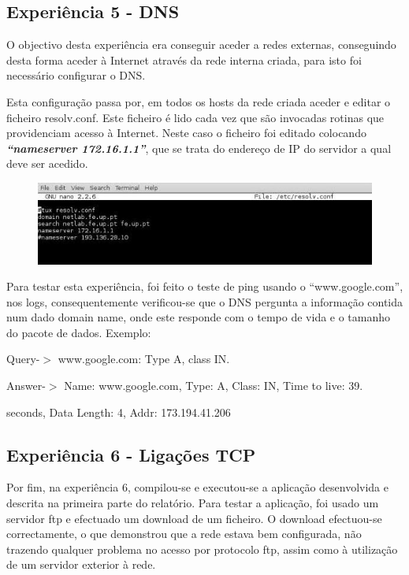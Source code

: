\documentclass[a4paper]{article}
\begin{document}
\subsection{Experiência 5 - DNS}
O objectivo desta experiência era conseguir aceder a redes externas, conseguindo desta forma aceder à Internet através da rede interna criada, para isto foi necessário configurar o DNS. 

Esta configuração passa por, em todos os hosts da rede criada aceder e editar o ficheiro resolv.conf. Este ficheiro é lido cada vez que são invocadas rotinas que providenciam acesso à Internet. Neste caso o ficheiro foi editado colocando \textbf{\textit{“nameserver 172.16.1.1”}}, que se trata do endereço de IP do servidor a qual deve ser acedido.	

\begin{figure}[h!]
\centering
\includegraphics[scale=0.5]{res/image4.jpg}
\end{figure}

Para testar esta experiência, foi feito o teste de ping usando o “www.google.com”, nos logs, consequentemente verificou-se que o DNS pergunta a informação contida num dado domain name, onde este responde com o tempo de vida e o tamanho do pacote de dados.\linebreak
Exemplo:

Query-$>$ www.google.com: Type A, class IN.

Answer-$>$ Name: www.google.com, Type: A, Class: IN, Time to live: 39.

seconds, Data Length: 4, Addr: 173.194.41.206

\subsection{Experiência 6 - Ligações TCP}
Por fim, na experiência 6, compilou-se e executou-se a aplicação desenvolvida e descrita na primeira parte do relatório.
	Para testar a aplicação, foi usado um servidor ftp e efectuado um download de um ficheiro. O download efectuou-se correctamente, o que demonstrou que a rede estava bem configurada, não trazendo qualquer problema no acesso por protocolo ftp, assim como à utilização de um servidor exterior à rede.
\end{document}
